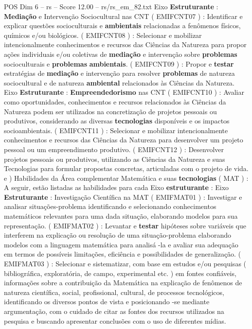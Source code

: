 \begin{textsample}{POS Dim 6 – rs – Score 12.00 – rs/rs\_em\_82.txt}
Eixo \textbf{Estruturante} : \textbf{Mediação} e Intervenção Sociocultural nas CNT ( EMIFCNT07 ) : Identificar e explicar questões socioculturais e \textbf{ambientais} relacionadas a fenômenos físicos, químicos e/ou biológicos. ( EMIFCNT08 ) : Selecionar e mobilizar intencionalmente conhecimentos e recursos das Ciências da Natureza para propor ações individuais e/ou coletivas de \textbf{mediação} e intervenção sobre \textbf{problemas} socioculturais e \textbf{problemas} \textbf{ambientais}. ( EMIFCNT09 ) : Propor e \textbf{testar} estratégias de \textbf{mediação} e intervenção para resolver \textbf{problemas} de natureza sociocultural e de natureza \textbf{ambiental} relacionados às Ciências da Natureza.
Eixo \textbf{Estruturante} : \textbf{Empreendedorismo} nas CNT ( EMIFCNT10 ) : Avaliar como oportunidades, conhecimentos e recursos relacionados às Ciências da Natureza podem ser utilizados na concretização de projetos pessoais ou produtivos, considerando as diversas \textbf{tecnologias} disponíveis e os impactos socioambientais. ( EMIFCNT11 ) : Selecionar e mobilizar intencionalmente conhecimentos e recursos das Ciências da Natureza para desenvolver um projeto pessoal ou um empreendimento produtivo. ( EMIFCNT12 ) : Desenvolver projetos pessoais ou produtivos, utilizando as Ciências da Natureza e suas Tecnologias para formular propostas concretas, articuladas com o projeto de vida. e ) Habilidades da Área complementar Matemática e suas \textbf{tecnologias} ( MAT ) : A seguir, estão listadas as habilidades para cada Eixo \textbf{estruturante} : Eixo \textbf{Estruturante} : Investigação Científica na MAT ( EMIFMAT01 ) : Investigar e analisar situações-problema identificando e selecionando conhecimentos matemáticos relevantes para uma dada situação, elaborando modelos para sua representação. ( EMIFMAT02 ) : Levantar e \textbf{testar} hipóteses sobre variáveis que interferem na explicação ou resolução de uma situação-problema elaborando modelos com a linguagem matemática para analisá -la e avaliar sua adequação em termos de possíveis limitações, eficiência e possibilidades de generalização. ( EMIFMAT03 ) : Selecionar e sistematizar, com base em estudos e/ou pesquisas ( bibliográfica, exploratória, de campo, experimental etc. ) em fontes confiáveis, informações sobre a contribuição da Matemática na explicação de fenômenos de natureza científica, social, profissional, cultural, de processos tecnológicos, identificando os diversos pontos de vista e posicionando -se mediante argumentação, com o cuidado de citar as fontes dos recursos utilizados na pesquisa e buscando apresentar conclusões com o uso de diferentes mídias.

\end{textsample}
